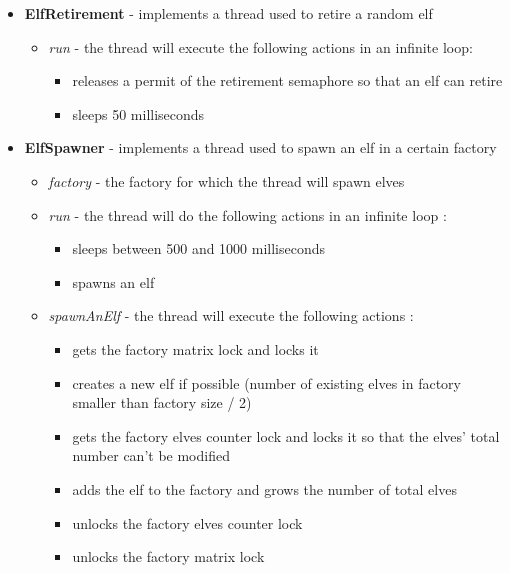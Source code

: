 \documentclass{article}
\begin{document}
\begin{itemize}
\begin{itemize}
            \end{itemize}
        \item \textbf{ElfRetirement} - implements a thread used to retire a random elf
            \begin{itemize}
            \item \textit{run} - the thread will execute the following actions in an infinite loop:
                \begin{itemize}
                \item releases a permit of the retirement semaphore so that an elf can retire
                \item sleeps 50 milliseconds
                \end{itemize}
            \end{itemize}
        \item \textbf{ElfSpawner} - implements a thread used to spawn an elf in a certain factory
            \begin{itemize}
                \item \textit{factory} - the factory for which the thread will spawn elves
                \item \textit{run} - the thread will do the following actions in an infinite loop :
                    \begin{itemize}
                        \item sleeps between 500 and 1000 milliseconds
                        \item spawns an elf
                    \end{itemize}
                \item \textit{spawnAnElf} - the thread will execute the following actions :
                    \begin{itemize}
                        \item gets the factory matrix lock and locks it
                        \item creates a new elf if possible (number of existing elves in factory smaller than factory size / 2)
                        \item gets the factory elves counter lock and locks it so that the elves' total number can't be modified
                        \item adds the elf to the factory and grows the number of total elves
                        \item unlocks the factory elves counter lock
                        \item unlocks the factory matrix lock
                

\end{itemize}
\end{itemize}
\end{itemize}
\end{document}
